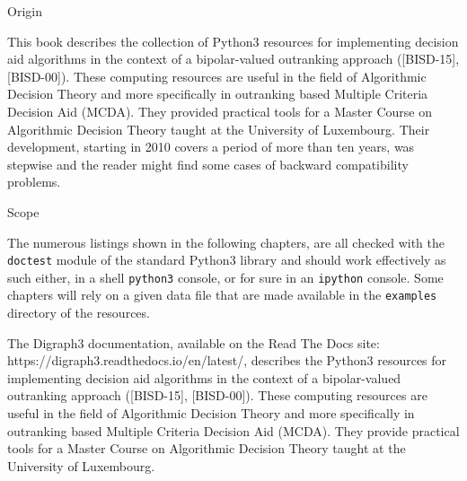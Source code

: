 %
%

\preface





Origin

This book describes the \Digraph collection of Python3 resources for implementing decision aid algorithms in the context of a bipolar-valued outranking approach ([BISD-15], [BISD-00]). These computing resources are useful in the field of Algorithmic Decision Theory and more specifically in outranking based Multiple Criteria Decision Aid (MCDA). They provided practical tools for a Master Course on Algorithmic Decision Theory taught at the University of Luxembourg. Their development, starting in 2010 covers a period of more than ten years, was stepwise and the reader might find some cases of backward compatibility problems.

Scope

The numerous listings shown in the following chapters, are all checked with the \texttt{doctest} module of the standard Python3 library and should work effectively as such either, in a shell \texttt{python3} console, or for sure in an \texttt{ipython} console. Some chapters will rely on a given data file that are made available in the \texttt{examples} directory of the \Digraph resources. 

The Digraph3 documentation, available on the Read The Docs site: https://digraph3.readthedocs.io/en/latest/, describes the Python3 resources for implementing decision aid algorithms in the context of a bipolar-valued outranking approach ([BISD-15], [BISD-00]). These computing resources are useful in the field of Algorithmic Decision Theory and more specifically in outranking based Multiple Criteria Decision Aid (MCDA). They provide practical tools for a Master Course on Algorithmic Decision Theory taught at the University of Luxembourg.

